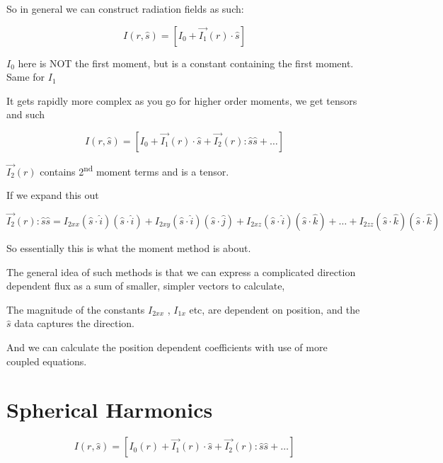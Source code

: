 \documentclass[12pt]{article}
\renewcommand{\_}{\kern-1.5pt\textunderscore\kern-1.5pt}
\begin{document}
\begin{itemize}
So in general we can construct radiation fields as such:\par

 \[ I \left( r,\hat{s} \right) = \left[ I_{0}+\overrightarrow{I_{1}} \left( r \right)  \cdot \hat{s} \right]  \] \par

 \( I_{0} \)  here is NOT the first moment, but is a constant containing the first moment. Same for  \( I_{1} \) \par


\vspace{\baselineskip}
It gets rapidly more complex as you go for higher order moments, we get tensors and such\par

 \[ I \left( r,\hat{s} \right) = \left[ I_{0}+\overrightarrow{I_{1}} \left( r \right)  \cdot \hat{s}+\overrightarrow{I_{2}} \left( r \right) :\hat{s}\hat{s}+ \ldots  \right]  \] \par

 \( \overrightarrow{I_{2}} \left( r \right)  \) \textbf{ }contains 2\textsuperscript{nd} moment terms and is a tensor.\par

If we expand this out\par

 \[ \overrightarrow{I_{2}} \left( r \right) :\hat{s}\hat{s}=I_{2xx} \left( \hat{s} \cdot \hat{i} \right)  \left( \hat{s} \cdot \hat{i} \right) +I_{2xy} \left( \hat{s} \cdot \hat{i} \right)  \left( \hat{s} \cdot \hat{j} \right) +I_{2xz} \left( \hat{s} \cdot \hat{i} \right)  \left( \hat{s} \cdot \hat{k} \right) + \ldots +I_{2zz} \left( \hat{s} \cdot \hat{k} \right)  \left( \hat{s} \cdot \hat{k} \right)  \] \par

So essentially this is what the moment method is about.\par

The general idea of such methods is that we can express a complicated direction dependent flux as a sum of smaller, simpler vectors to calculate,\par

The magnitude of the constants  \( I_{2xx} \) ,  \( I_{1x} \)  etc, are dependent on position, and the  \( \hat{s} \)  data captures the direction.\par

And we can calculate the position dependent coefficients with use of more coupled equations.\par


\end{itemize}\section*{Spherical Harmonics}
 \[ I \left( r,\hat{s} \right) = \left[ I_{0} \left( r \right) +\overrightarrow{I_{1}} \left( r \right)  \cdot \hat{s}+\overrightarrow{I_{2}} \left( r \right) :\hat{s}\hat{s}+ \ldots  \right]  \] \par
\end{document}
